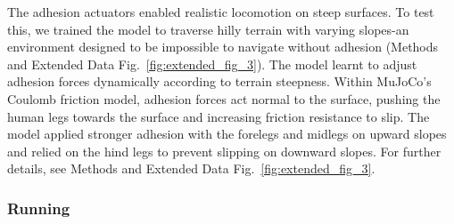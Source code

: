 \documentclass[sn-mathphys-num]{sn-jnl}%
\theoremstyle{thmstyleone}	%
\theoremstyle{thmstyletwo}	%
\theoremstyle{thmstylethree}	%
\begin{document}
The adhesion actuators enabled realistic locomotion on steep surfaces. 
To test this, we trained the model to traverse hilly terrain with varying slopes-an environment designed to be impossible to navigate without adhesion (Methods and Extended Data Fig.~\ref{fig:extended_fig_3}). 
The model learnt to adjust adhesion forces dynamically according to terrain steepness. 
Within MuJoCo's Coulomb friction model, adhesion forces act normal to the surface, pushing the human legs towards the surface and increasing friction resistance to slip. 
The model applied stronger adhesion with the forelegs and midlegs on upward slopes and relied on the hind legs to prevent slipping on downward slopes. 
For further details, see Methods and Extended Data Fig.~\ref{fig:extended_fig_3}.




\subsubsection{Running}
\end{document}
